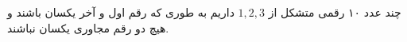 چند عدد ۱۰ رقمی متشکل از $1, 2, 3$ داریم به طوری که رقم اول و آخر یکسان باشند و هیچ دو رقم مجاوری یکسان نباشند.